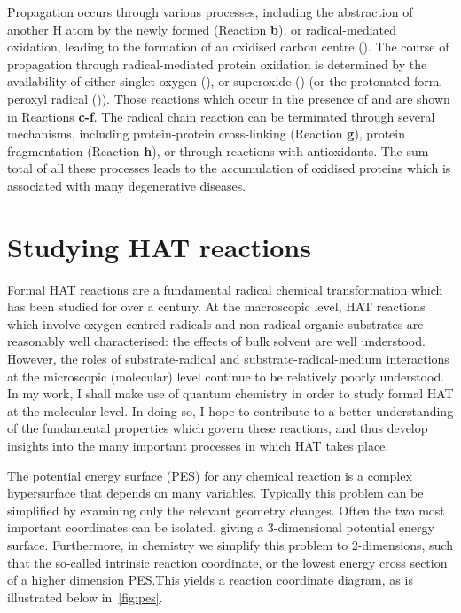 Propagation occurs through various processes, including the abstraction of another H atom by the newly formed  (Reaction \textbf{b}), or radical-mediated oxidation,\cite{Stadtman2003} leading to the formation of an oxidised carbon centre (). The course of propagation through radical-mediated protein oxidation is determined by the availability of either singlet oxygen (), or superoxide () (or the protonated form, peroxyl radical ()). Those reactions which occur in the presence of  and  are shown in Reactions \textbf{c-f}. The radical chain reaction can be terminated through several mechanisms, including protein-protein cross-linking (Reaction \textbf{g}), protein fragmentation (Reaction \textbf{h}), or through reactions with antioxidants. The sum total of all these processes leads to the accumulation of oxidised proteins which is associated with many degenerative diseases.\cite{Halliwell2006}

\section{Studying HAT reactions}

Formal HAT reactions are a fundamental radical chemical transformation which has been studied for over a century.\cite{Kochi1973,Parsons2000} At the macroscopic level, HAT reactions which involve oxygen-centred radicals and non-radical organic substrates are reasonably well characterised: the effects of bulk solvent are well understood.\cite{Litwinienko2007} However, the roles of substrate-radical and substrate-radical-medium interactions at the microscopic (molecular) level continue to be relatively poorly understood. In my work, I shall make use of quantum chemistry in order to study formal HAT at the molecular level. In doing so, I hope to contribute to a better understanding of the fundamental properties which govern these reactions, and thus develop insights into the many important processes in which HAT takes place.

The potential energy surface (PES) for any chemical reaction is a complex hypersurface that depends on many variables. Typically this problem can be simplified by examining only the relevant geometry changes. Often the two most important coordinates can be isolated, giving a 3-dimensional potential energy surface. Furthermore, in chemistry we simplify this problem to 2-dimensions, such that the so-called intrinsic reaction coordinate, or the lowest energy cross section of a higher dimension PES.\@ This yields a reaction coordinate diagram, as is illustrated below in~\ref{fig:pes}.

